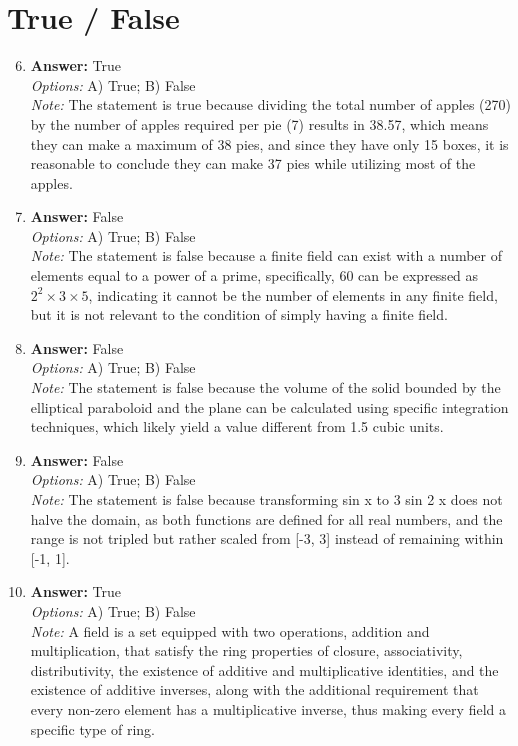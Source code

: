 \documentclass[12pt]{article}
\begin{document}
\section*{True / False}
\begin{enumerate}[label=\arabic*.]
\setcounter{enumi}{5}
\item \textbf{Answer:} True
\\ \textit{Options:} A) True; B) False
\\ \textit{Note:} The statement is true because dividing the total number of apples (270) by the number of apples required per pie (7) results in 38.57, which means they can make a maximum of 38 pies, and since they have only 15 boxes, it is reasonable to conclude they can make 37 pies while utilizing most of the apples.
\item \textbf{Answer:} False
\\ \textit{Options:} A) True; B) False
\\ \textit{Note:} The statement is false because a finite field can exist with a number of elements equal to a power of a prime, specifically, 60 can be expressed as \(2^2 \times 3 \times 5\), indicating it cannot be the number of elements in any finite field, but it is not relevant to the condition of simply having a finite field.
\item \textbf{Answer:} False
\\ \textit{Options:} A) True; B) False
\\ \textit{Note:} The statement is false because the volume of the solid bounded by the elliptical paraboloid and the plane can be calculated using specific integration techniques, which likely yield a value different from 1.5 cubic units.
\item \textbf{Answer:} False
\\ \textit{Options:} A) True; B) False
\\ \textit{Note:} The statement is false because transforming sin x to 3 sin 2 x does not halve the domain, as both functions are defined for all real numbers, and the range is not tripled but rather scaled from [-3, 3] instead of remaining within [-1, 1].
\item \textbf{Answer:} True
\\ \textit{Options:} A) True; B) False
\\ \textit{Note:} A field is a set equipped with two operations, addition and multiplication, that satisfy the ring properties of closure, associativity, distributivity, the existence of additive and multiplicative identities, and the existence of additive inverses, along with the additional requirement that every non-zero element has a multiplicative inverse, thus making every field a specific type of ring.
\end{enumerate}
\end{document}
